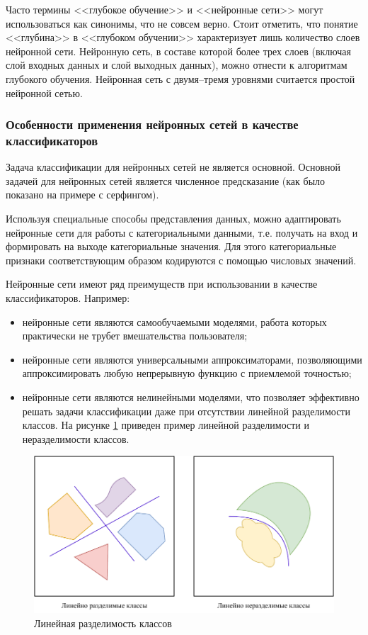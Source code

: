 Часто термины <<глубокое обучение>> и <<нейронные сети>> могут использоваться как синонимы, что не совсем верно. Стоит отметить, что понятие <<глубина>> в <<глубоком обучении>> характеризует лишь количество слоев нейронной сети. Нейронную сеть, в составе которой более трех слоев (включая слой входных данных и слой выходных данных), можно отнести к алгоритмам глубокого обучения. Нейронная сеть с двумя--тремя уровнями считается простой нейронной сетью.

\subsubsection{Особенности применения нейронных сетей в качестве классификаторов}

Задача классификации для нейронных сетей не является основной. Основной задачей для нейронных сетей является численное предсказание (как было показано на примере с серфингом).

Используя специальные способы представления данных, можно адаптировать нейронные сети для работы с категориальными данными, т.е. получать на вход и формировать на выходе категориальные значения. Для этого категориальные признаки соответствующим образом кодируются с помощью числовых значений.

Нейронные сети имеют ряд преимуществ при использовании в качестве классификаторов. Например:
\begin{itemize}[leftmargin=1.6\parindent]
	\item нейронные сети являются самообучаемыми моделями, работа которых практически не трубет вмешательства пользователя;
	\item нейронные сети являются универсальными аппроксиматорами, позволяющими аппроксимировать любую непрерывную функцию с приемлемой точностью;
	\item нейронные сети являются нелинейными моделями, что позволяет эффективно решать задачи классификации даже при отсутствии линейной разделимости классов. На рисунке \ref{fig:separation} приведен пример линейной разделимости и неразделимости классов.
\end{itemize}

\begin{figure}[H]
	\centering
	\includegraphics[width=\textwidth]{img/separation.pdf}
	\caption{Линейная разделимость классов}
	\label{fig:separation}
\end{figure}

